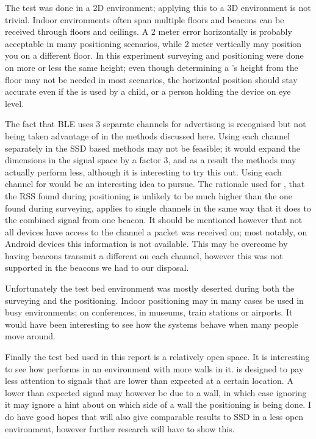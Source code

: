The test was done in a 2D environment; applying this to a 3D environment is not trivial.
Indoor environments often span multiple floors and beacons can be received through floors and ceilings.
A 2 meter error horizontally is probably acceptable in many positioning scenarios, while 2 meter vertically may position you on a different floor.
In this experiment surveying and positioning were done on more or less the same height; even though determining a \device's height from the floor may not be needed in most scenarios, the horizontal position should stay accurate even if the \device is used by a child, or a person holding the device on eye level.

The fact that BLE uses 3 separate channels for advertising is recognised but not being taken advantage of in the methods discussed here.
Using each channel separately in the SSD based methods may not be feasible; it would expand the dimensions in the signal space by a factor 3, and as a result the methods may actually perform less, although it is interesting to try this out.
Using each channel for \aBRP would be an interesting idea to pursue.
The rationale used for \aBRP, that the RSS found during positioning is unlikely to be much higher than the one found during surveying, applies to single channels in the same way that it does to the combined signal from one beacon.
It should be mentioned however that not all devices have access to the channel a packet was received on; most notably, on Android devices this information is not available.
This may be overcome by having beacons transmit a different \bid on each channel, however this was not supported in the beacons we had to our disposal.

Unfortunately the test bed environment was mostly deserted during both the surveying and the positioning.
Indoor positioning may in many cases be used in busy environments; on conferences, in museums, train stations or airports.
It would have been interesting to see how the systems behave when many people move around.

Finally the test bed used in this report is a relatively open space.
It is interesting to see how \aBRP performs in an environment with more walls in it.
\aBRP is designed to pay less attention to signals that are lower than expected at a certain location.
A lower than expected signal may however be due to a wall, in which case ignoring it may ignore a hint about on which side of a wall the positioning is being done.
I do have good hopes that \aBRP will also give comparable results to SSD in a less open environment, however further research will have to show this.

